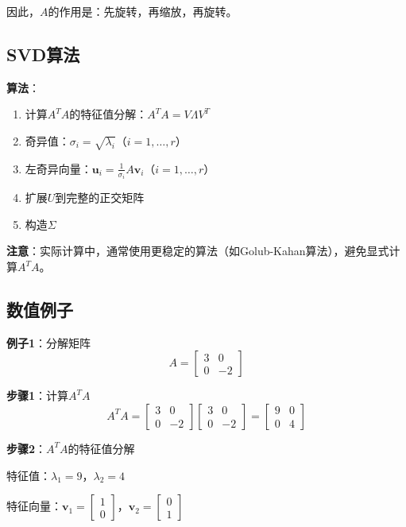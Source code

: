 \documentclass[12pt,a4paper]{article}
\begin{document}
因此，$A$的作用是：先旋转，再缩放，再旋转。

\subsection{SVD算法}

\textbf{算法}：
\begin{enumerate}
\item 计算$A^T A$的特征值分解：$A^T A = V \Lambda V^T$
\item 奇异值：$\sigma_i = \sqrt{\lambda_i}$（$i = 1, \ldots, r$）
\item 左奇异向量：$\bm{u}_i = \frac{1}{\sigma_i} A \bm{v}_i$（$i = 1, \ldots, r$）
\item 扩展$U$到完整的正交矩阵
\item 构造$\Sigma$
\end{enumerate}

\textbf{注意}：实际计算中，通常使用更稳定的算法（如Golub-Kahan算法），避免显式计算$A^T A$。

\subsection{数值例子}

\textbf{例子1}：分解矩阵
\begin{equation}
A = \begin{bmatrix} 3 & 0 \\ 0 & -2 \end{bmatrix}
\end{equation}

\textbf{步骤1}：计算$A^T A$
\begin{equation}
A^T A = \begin{bmatrix} 3 & 0 \\ 0 & -2 \end{bmatrix} \begin{bmatrix} 3 & 0 \\ 0 & -2 \end{bmatrix} = \begin{bmatrix} 9 & 0 \\ 0 & 4 \end{bmatrix}
\end{equation}

\textbf{步骤2}：$A^T A$的特征值分解

特征值：$\lambda_1 = 9$，$\lambda_2 = 4$

特征向量：$\bm{v}_1 = \begin{bmatrix} 1 \\ 0 \end{bmatrix}$，$\bm{v}_2 = \begin{bmatrix} 0 \\ 1 \end{bmatrix}$
\end{document}
